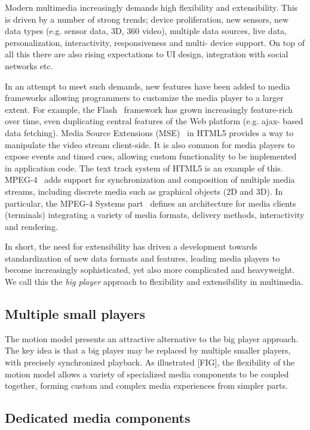 Modern multimedia increasingly demands high flexibility and extensibility.
This is driven by a number of strong trends; device proliferation, new
sensors, new data types (e.g. sensor data, 3D, 360 video), multiple data
sources, live data, personalization, interactivity, responsiveness and multi-
device support. On top of all this there are also rising expectations to UI
design, integration with social networks etc.

In an attempt to meet such demands, new features have been added to media
frameworks allowing programmers to customize the media player to a larger
extent. For example, the Flash~\cite{flash} framework has grown increasingly feature-rich
over time, even duplicating central features of the Web platform (e.g. ajax-
based data fetching). Media Source Extensions (MSE)~\cite{mse} in HTML5 provides a way to
manipulate the video stream client-side. It is also common for media players
to expose events and timed cues, allowing custom functionality to be
implemented in application code. The text track system of HTML5 is an example
of this. MPEG-4~\cite{mpeg4} adds support for synchronization and composition of
multiple media streams, including discrete media such as graphical objects (2D
and 3D). In particular, the MPEG-4 Systems part~\cite{mpeg4sys} defines an architecture
for media clients (terminals) integrating a variety of media formats, delivery
methods, interactivity and rendering.

In short, the need for extensibility has driven a development towards
standardization of new data formats and features, leading media players to
become increasingly sophisticated, yet also more complicated and heavyweight.
We call this the \emph{big player} approach to flexibility and extensibility in
multimedia.


\subsection{Multiple small players}

The motion model presents an attractive alternative to the big
player approach. The key idea is that a big player may be replaced by multiple
smaller players, with precisely synchronized playback. As illustrated [FIG],
the flexibility of the motion model allows a variety of
specialized media components to be coupled together, forming custom and
complex media experiences from simpler parts.


\subsection{Dedicated media components}

